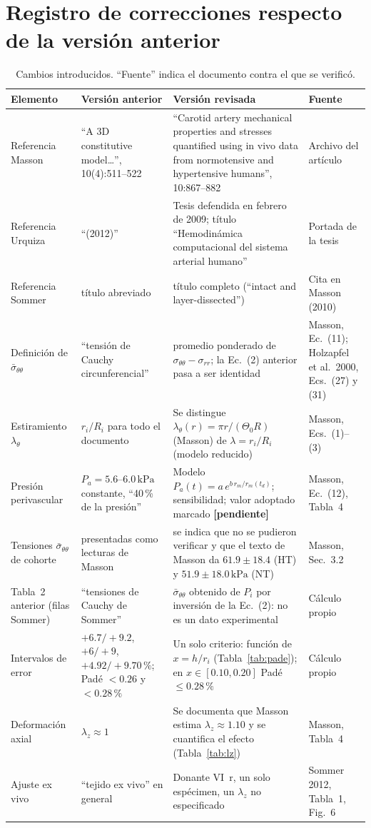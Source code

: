 \documentclass[11pt]{article}
\newcommand{\kPa}{\,\mathrm{kPa}}
\newcommand{\sbar}{\bar\sigma_{\theta\theta}}
\newcommand{\pend}{\textcolor{red!70!black}{\textbf{[pendiente]}}}
\begin{document}
\section{Registro de correcciones respecto de la versión anterior}\label{sec:reg}
\begin{table}[H]\centering\small
\caption{Cambios introducidos. ``Fuente'' indica el documento contra el que se verificó.}
\begin{tabular}{p{3.0cm}p{4.6cm}p{4.9cm}p{2.0cm}}\toprule
Elemento & Versión anterior & Versión revisada & Fuente\\\midrule
Referencia Masson & ``A 3D constitutive model\ldots'', 10(4):511--522 & ``Carotid artery mechanical properties and stresses quantified using in vivo data from normotensive and hypertensive humans'', 10:867--882 & Archivo del artículo\\
Referencia Urquiza & ``(2012)'' & Tesis defendida en febrero de 2009; título ``Hemodinámica computacional del sistema arterial humano'' & Portada de la tesis\\
Referencia Sommer & título abreviado & título completo (``intact and layer-dissected'') & Cita en Masson (2010)\\
Definición de $\sbar$ & ``tensión de Cauchy circunferencial'' & promedio ponderado de $\sigma_{\theta\theta}-\sigma_{rr}$; la Ec.~(2) anterior pasa a ser identidad & Masson, Ec.~(11); Holzapfel et al.\ 2000, Ecs.~(27) y (31)\\
Estiramiento $\lambda_\theta$ & $r_i/R_i$ para todo el documento & Se distingue $\lambda_\theta(r)=\pi r/(\Theta_0R)$ (Masson) de $\lambda=r_i/R_i$ (modelo reducido) & Masson, Ecs.~(1)--(3)\\
Presión perivascular & $P_a=5.6$--$6.0\kPa$ constante, ``40\,\% de la presión'' & Modelo $P_a(t)=a\,e^{b\,r_m/r_m(t_d)}$; sensibilidad; valor adoptado marcado \pend & Masson, Ec.~(12), Tabla~4\\
Tensiones $\sbar$ de cohorte & presentadas como lecturas de Masson & se indica que no se pudieron verificar y que el texto de Masson da $61.9\pm18.4$ (HT) y $51.9\pm18.0\kPa$ (NT) & Masson, Sec.~3.2\\
Tabla~2 anterior (filas Sommer) & ``tensiones de Cauchy de Sommer'' & $\sbar$ obtenido de $P_i$ por inversión de la Ec.~(2): no es un dato experimental & Cálculo propio\\
Intervalos de error & $+6.7/+9.2$, $+6/+9$, $+4.92/+9.70\,\%$; Padé $<0.26$ y $<0.28\,\%$ & Un solo criterio: función de $x=h/r_i$ (Tabla~\ref{tab:pade}); en $x\in[0.10,0.20]$ Padé $\le0.28\,\%$ & Cálculo propio\\
Deformación axial & $\lambda_z\approx1$ & Se documenta que Masson estima $\lambda_z\approx1.10$ y se cuantifica el efecto (Tabla~\ref{tab:lz}) & Masson, Tabla~4\\
Ajuste ex vivo & ``tejido ex vivo'' en general & Donante VI~r, un solo espécimen, un $\lambda_z$ no especificado & Sommer 2012, Tabla~1, Fig.~6\\\bottomrule
\end{tabular}
\end{table}
\end{document}
